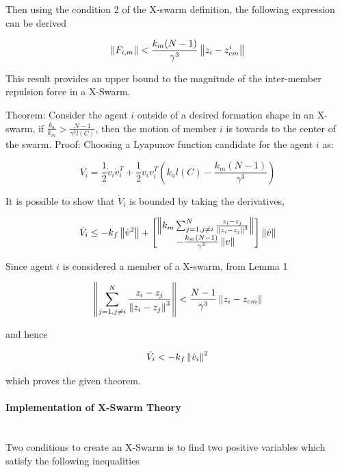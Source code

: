 Then using the condition 2 of the X-swarm definition, the following expression can be derived

\begin{equation}
\left\lVert F_{i,m}\right\rVert < \frac{k_m(N-1)}{\gamma^3} \left\lVert z_i - z_{cm}^i\right\rVert
\end{equation}

This result provides an upper bound to the magnitude of the inter-member repulsion force in a X-Swarm.  
		
Theorem: Consider the agent $i$	outside of a desired formation shape in an X-swarm, if $\frac{k_a}{k_m} > \frac{N-1}{\gamma^3  l(C)}$, then the motion of member $i$ is towards to the center of the swarm. \newline
Proof: Choosing a Lyapunov function candidate for the agent $i$ as:

\begin{equation}
V_i = \frac{1}{2} \dot{v}_i \dot{v}_i^T + \frac{1}{2} v_i v_i^T\left(k_al(C)-\frac{k_m(N-1)}{\gamma^3}\right) 
\end{equation}

It is possible to show that $\dot{V}_i$ is bounded by taking the derivatives,
			
\begin{equation}
\dot{V}_i \leq -k_f \left\lVert\dot{v}^2\right\rVert + \begin{bmatrix}
\left\lVert k_m \sum_{j=1, j \neq i}^{N} \frac{z_i - z_j}{\left\lVert z_i - z_j\right\rVert^3}\right\rVert \\
- \frac{k_m(N-1)}{\gamma ^3} \left\lVert v\right\rVert
\end{bmatrix} \left\lVert\dot{v}\right\rVert
\end{equation}
			
Since agent $i$ is considered a member of a X-swarm, from Lemma 1

\begin{equation}
\left\lVert \sum_{j=1, j \neq i}^{N} \frac{z_i - z_j}{\left\lVert z_i - z_j\right\rVert^3}\right\rVert < \frac{N-1}{\gamma^3} \left\lVert z_i - z_{cm}\right\rVert
\end{equation}

and hence

\begin{equation}
\dot{V}_i < -k_f \left\lVert\dot{v}_i\right\rVert ^2
\end{equation}

which proves the given theorem.  \newline

\paragraph{Implementation of X-Swarm Theory}\hspace{0pt} \\		
Two conditions to create an X-Swarm is to find two positive variables which satisfy the following inequalities

